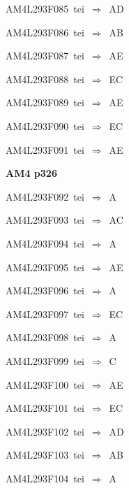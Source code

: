 {\sixrm AM4L293F085\ {\sixit tei}\ }$\Rightarrow$\ AD\par\smallskip
{\sixrm AM4L293F086\ {\sixit tei}\ }$\Rightarrow$\ AB\par\smallskip
{\sixrm AM4L293F087\ {\sixit tei}\ }$\Rightarrow$\ AE\par\smallskip
{\sixrm AM4L293F088\ {\sixit tei}\ }$\Rightarrow$\ EC\par\smallskip
{\sixrm AM4L293F089\ {\sixit tei}\ }$\Rightarrow$\ AE\par\smallskip
{\sixrm AM4L293F090\ {\sixit tei}\ }$\Rightarrow$\ EC\par\smallskip
{\sixrm AM4L293F091\ {\sixit tei}\ }$\Rightarrow$\ AE\par\smallskip

\par\vfill\eject
{\bf\hfill AM4 p326\hfill\hbox{}}\par\bigskip
{\sixrm AM4L293F092\ {\sixit tei}\ }$\Rightarrow$\ A\par\smallskip
{\sixrm AM4L293F093\ {\sixit tei}\ }$\Rightarrow$\ AC\par\smallskip
{\sixrm AM4L293F094\ {\sixit tei}\ }$\Rightarrow$\ A\par\smallskip
{\sixrm AM4L293F095\ {\sixit tei}\ }$\Rightarrow$\ AE\par\smallskip
{\sixrm AM4L293F096\ {\sixit tei}\ }$\Rightarrow$\ A\par\smallskip
{\sixrm AM4L293F097\ {\sixit tei}\ }$\Rightarrow$\ EC\par\smallskip
{\sixrm AM4L293F098\ {\sixit tei}\ }$\Rightarrow$\ A\par\smallskip
{\sixrm AM4L293F099\ {\sixit tei}\ }$\Rightarrow$\ C\par\smallskip
{\sixrm AM4L293F100\ {\sixit tei}\ }$\Rightarrow$\ AE\par\smallskip
{\sixrm AM4L293F101\ {\sixit tei}\ }$\Rightarrow$\ EC\par\smallskip
{\sixrm AM4L293F102\ {\sixit tei}\ }$\Rightarrow$\ AD\par\smallskip
{\sixrm AM4L293F103\ {\sixit tei}\ }$\Rightarrow$\ AB\par\smallskip
{\sixrm AM4L293F104\ {\sixit tei}\ }$\Rightarrow$\ {\tenit A}\par\smallskip

